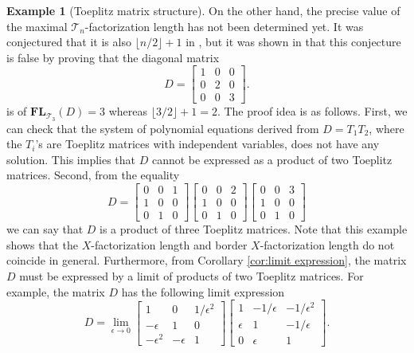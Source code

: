\documentclass[reqno]{amsart}
\theoremstyle{definition}
\newtheorem{example}[theorem]{Example}
\numberwithin{equation}{section}
\begin{document}
\begin{example}[Toeplitz matrix structure]
    On the other hand, the precise value of the maximal $\mathcal{T}_n$-factorization length has not been determined yet. It was conjectured that it is also $\lfloor n/2 \rfloor +1$ in \cite[Conjecture 1]{ye2016every}, but it was shown in \cite{garcia2025minimum} that this conjecture is false by proving that the diagonal matrix 
    \begin{equation*}
        D=\begin{bmatrix}
            1 & 0 & 0\\
            0 & 2 & 0\\
            0 & 0 & 3
        \end{bmatrix}.
    \end{equation*}
    is of $\mathbf{FL}_{\mathcal{T}_3}(D) = 3$ whereas $\lfloor 3/2 \rfloor +1=2$. The proof idea is as follows. First, we can check that the system of polynomial equations derived from $D=T_1T_2$, where the $T_i$'s are Toeplitz matrices with independent variables, does not have any solution. This implies that $D$ cannot be expressed as a product of two Toeplitz matrices. Second, from the equality 
    \begin{equation*}
        D=\begin{bmatrix}
            0 & 0 & 1\\
            1 & 0 & 0\\
            0 & 1 & 0
        \end{bmatrix}\begin{bmatrix}
            0 & 0 & 2\\
            1 & 0 & 0\\
            0 & 1 & 0
        \end{bmatrix}\begin{bmatrix}
            0 & 0 & 3\\
            1 & 0 & 0\\
            0 & 1 & 0
        \end{bmatrix}
    \end{equation*} 
    we can say that $D$ is a product of three Toeplitz matrices. Note that this example shows that the $X$-factorization length and border $X$-factorization length do not coincide in general. Furthermore, from Corollary \ref{cor:limit expression}, the matrix $D$ must be expressed by a limit of products of two Toeplitz matrices. For example, the matrix $D$ has the following limit expression
    \begin{equation*}
           D=\lim_{\epsilon \rightarrow 0}\begin{bmatrix}
        1 & 0 & 1/\epsilon^2\\
        -\epsilon & 1 & 0\\
        -\epsilon^2 & -\epsilon & 1
           \end{bmatrix}\begin{bmatrix}
        1 & -1/\epsilon & -1/\epsilon^2\\
        \epsilon & 1 & -1/\epsilon\\
        0 & \epsilon & 1
        \end{bmatrix}.
    \end{equation*}
\end{example}
\end{document}
